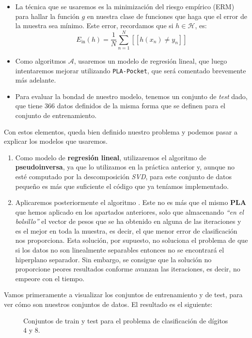 \documentclass[12pt]{article}
\begin{document}
{\begin{itemize}
\item La técnica que se usaremos es la minimización del riesgo empírico (ERM) para hallar la función $g$ en nuestra clase de funciones que haga que el error de la muestra sea mínimo. Este error, recordamos que si $h \in \mathcal H$, es:
$$
E_{\operatorname{in}}(h) = \frac{1}{N} \sum_{n = 1}^N [[ h(x_n) \neq y_n]]
$$

\item Como algoritmos $\mathcal A$, usaremos un modelo de regresión lineal, que luego intentaremos mejorar utilizando \lstinline{PLA-Pocket}, que será comentado brevemente más adelante.

\item Para evaluar la bondad de nuestro modelo, tenemos un conjunto de \emph{test} dado, que tiene $366$ datos definidos de la misma forma que se definen para el conjunto de entrenamiento.


\end{itemize}

Con estos elementos, queda bien definido nuestro problema y podemos pasar a explicar los modelos que usaremos. 
\begin{enumerate}
\item Como modelo de \textbf{regresión lineal}, utilizaremos el algoritmo de \textbf{pseudoinversa}, ya que lo utilizamos en la práctica anterior y, aunque no esté computado por la descomposición \emph{SVD}, para este conjunto de datos pequeño es más que suficiente el código que ya teníamos implementado.

\item Aplicaremos posteriormente el algoritmo . Este no es más que el mismo \textbf{PLA} que hemos aplicado en los apartados anteriores, solo que almacenando \emph{``en el bolsillo''} el vector de pesos que se ha obtenido en alguna de las iteraciones y es el mejor en toda la muestra, es decir, el que menor error de clasificación nos proporciona. Esta solución, por supuesto, no soluciona el problema de que si los datos no son linealmente separables entonces no se encontrará el hiperplano separador. Sin embargo, se consigue que la solución no proporcione peores resultados conforme avanzan las iteraciones, es decir, no empeore con el tiempo.

\end{enumerate}


Vamos primeramente a visualizar los conjuntos de entrenamiento y de test, para ver cómo son nuestros conjuntos de datos. El resultado es el siguiente:
\begin{figure}[H]
  \centering
  \qquad
  \caption{Conjuntos de train y test para el problema de clasificación de dígitos $4$ y $8$.}
\label{fig:myfig:4}
\end{figure}

}
\end{document}
